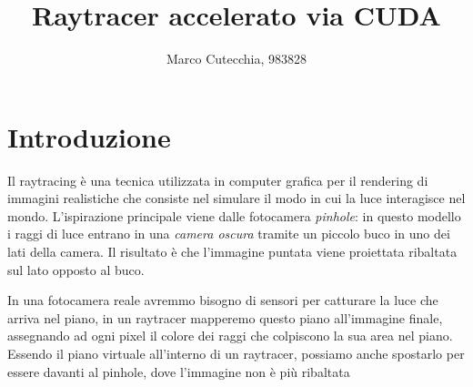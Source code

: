 \documentclass[12pt, twoside]{article}
\begin{document}
\title{Raytracer accelerato via CUDA}

\author{Marco Cutecchia, 983828}

\date{}

\maketitle

\section{Introduzione}
Il raytracing è una tecnica utilizzata in computer grafica per il rendering
di immagini realistiche che consiste nel simulare il modo in cui la luce
interagisce nel mondo.
L'ispirazione principale viene dalle fotocamera \textit{pinhole}:
in questo modello i raggi di luce entrano in una \textit{camera oscura}
tramite un piccolo buco in uno dei lati della camera.
Il risultato è che l'immagine puntata viene proiettata ribaltata sul
lato opposto al buco.

In una fotocamera reale avremmo bisogno di sensori per catturare la luce che
arriva nel piano, in un raytracer mapperemo questo piano all'immagine finale,
assegnando ad ogni pixel il colore dei raggi che colpiscono la sua area nel
piano.
Essendo il piano virtuale all'interno di un raytracer, possiamo anche spostarlo
per essere davanti al pinhole, dove l'immagine non è più ribaltata
\end{document}
